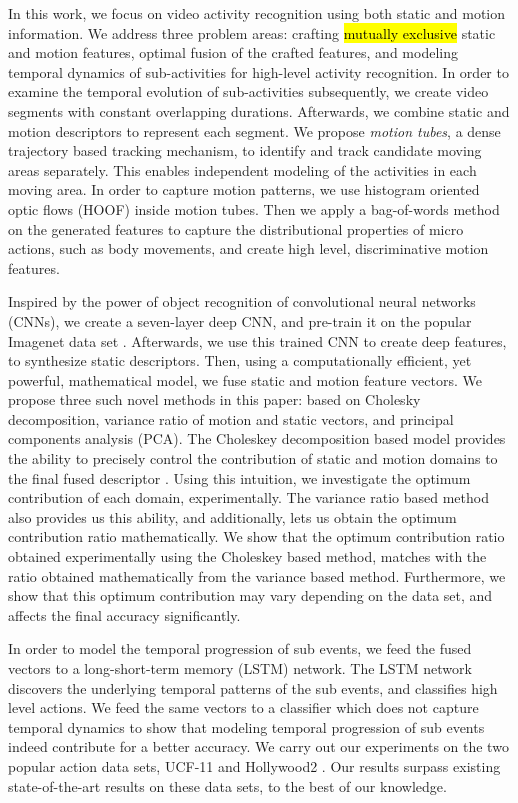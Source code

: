 In this work, we focus on video activity recognition using both static and motion information. We address three problem areas: crafting \hl{mutually exclusive} static and motion features, optimal fusion of the crafted features, and
modeling temporal dynamics of sub-activities for high-level activity recognition. In order to examine the temporal evolution
of sub-activities subsequently, we create video segments with constant overlapping durations. Afterwards, we combine static and motion
descriptors to represent each segment. We propose \textit{motion tubes},
a dense trajectory \cite{wang2011action} based tracking mechanism, to identify and track candidate moving areas
separately. This enables independent modeling of the activities in each moving area.
In order to capture motion patterns, we use histogram oriented optic flows (HOOF) \cite{chaudhry2009histograms}
inside motion tubes. Then we apply a bag-of-words method on the generated
features to capture the distributional properties of micro actions, such as body movements, and create high level, discriminative motion features.

Inspired by the power  of object recognition of convolutional neural networks (CNNs), we create a seven-layer deep
CNN, and pre-train it on the popular Imagenet data set \cite{deng2012imagenet}.
Afterwards, we use this trained CNN to create deep features, to synthesize static descriptors. 
Then, using a computationally efficient, yet powerful, mathematical model, we fuse static and motion feature vectors. We propose three such novel methods in this paper: based on
Cholesky decomposition, variance ratio of motion and static vectors, and principal components analysis (PCA). The Choleskey decomposition based model provides the ability to
precisely control the contribution of static and motion domains to the final fused descriptor . Using this intuition, we investigate the
optimum contribution of each domain, experimentally.  The variance ratio based method also provides us this ability, and additionally, lets us
obtain the optimum contribution ratio mathematically. We show that the optimum contribution ratio obtained experimentally using the Choleskey based method,
matches with the ratio obtained mathematically from the variance based method. Furthermore, we show that this optimum contribution may
vary depending on the data set, and affects the final accuracy significantly. 


In order to model the temporal progression of sub events, we feed the fused vectors to
a long-short-term memory (LSTM) network. The LSTM network discovers the underlying temporal patterns of the sub events, and classifies high level actions.
We feed the same vectors to a classifier which does not capture temporal dynamics to show that modeling temporal progression of sub events indeed contribute for a better
accuracy. We carry out our experiments on the two popular action data sets, UCF-11 \cite{liu2009recognizing}
and Hollywood2 \cite{marszalek2009actions}. Our results surpass existing  state-of-the-art
results on these data sets, to the best of our knowledge.

